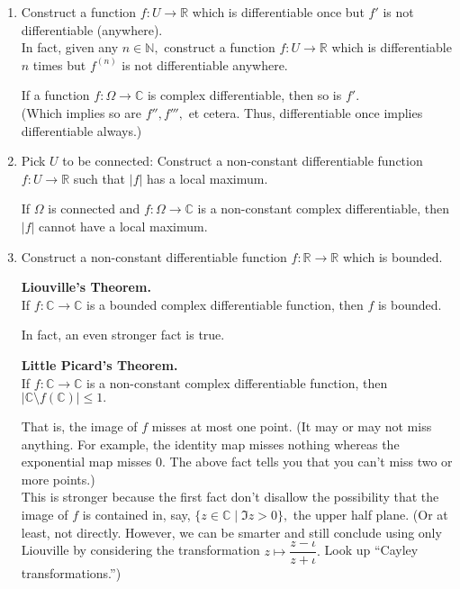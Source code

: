 \documentclass[12pt]{article}
\theoremstyle{definition}
\numberwithin{thm}{section}
\newenvironment{blockquote}
{\begin{mdframed}[skipabove=0pt, skipbelow=0pt, innertopmargin=4pt, innerbottommargin=4pt, bottomline=false,topline=false,rightline=false, linewidth=2pt]}
{\end{mdframed}}
\begin{document}
\begin{enumerate}
	\item Construct a function $f:U \to \mathbb{R}$ which is differentiable once but $f'$ is not differentiable (anywhere).\\
	In fact, given any $n \in \mathbb{N},$ construct a function $f:U\to \mathbb{R}$ which is differentiable $n$ times but $f^{(n)}$ is not differentiable anywhere.\\
	\begin{blockquote}
		If a function $f:\Omega \to \mathbb{C}$ is complex differentiable, then so is $f'.$\\
		(Which implies so are $f'', f''',$ et cetera. Thus, differentiable once implies differentiable always.)
	\end{blockquote}
	\item Pick $U$ to be connected: Construct a non-constant differentiable function $f:U\to \mathbb{R}$ such that $|f|$ has a local maximum. \\
	\begin{blockquote}
		If $\Omega$ is connected and $f:\Omega \to \mathbb{C}$ is a non-constant complex differentiable, then $|f|$ cannot have a local maximum.
	\end{blockquote}
	\item Construct a non-constant differentiable function $f:\mathbb{R} \to \mathbb{R}$ which is bounded.\\
	\begin{blockquote}
		\textbf{Liouville's Theorem.}\\
		If $f:\mathbb{C} \to \mathbb{C}$ is a bounded complex differentiable function, then $f$ is bounded.
	\end{blockquote}
	In fact, an even stronger fact is true.\\
	\begin{blockquote}
		\textbf{Little Picard's Theorem.}\\
		If $f:\mathbb{C} \to \mathbb{C}$ is a non-constant complex differentiable function, then $\left|\mathbb{C}\setminus f(\mathbb{C})\right| \le 1.$
	\end{blockquote}
	That is, the image of $f$ misses at most one point. (It may or may not miss anything. For example, the identity map misses nothing whereas the exponential map misses $0.$ The above fact tells you that you can't miss two or more points.)\\
	This is stronger because the first fact don't disallow the possibility that the image of $f$ is contained in, say, $\{z \in \mathbb{C} \mid \Im z > 0\},$ the upper half plane. (Or at least, not directly. However, we can be smarter and still conclude using only Liouville by considering the transformation $z \mapsto \dfrac{z - \iota}{z + \iota}.$ Look up ``Cayley transformations.'')

\end{enumerate}
\end{document}

